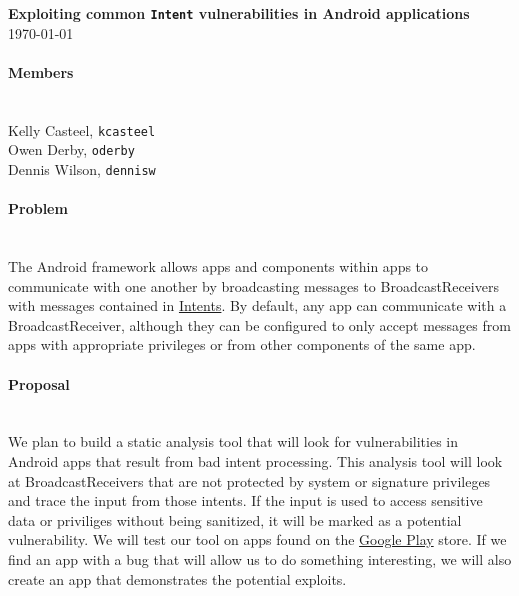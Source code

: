 \documentclass[12pt,a4paper,draft]{article}
\begin{document}


\flushleft\textbf{Exploiting common \texttt{Intent} vulnerabilities in Android %
applications}\\
\today\\

\paragraph{Members} ~\\

Kelly Casteel, \texttt{kcasteel}\\
Owen Derby, \texttt{oderby}\\
Dennis Wilson, \texttt{dennisw}\\

\paragraph{Problem} ~\\
The Android framework allows apps and components within apps to communicate with
one another by broadcasting messages to BroadcastReceivers with messages
contained in
\href{https://developer.android.com/reference/android/content/Intent.html}{Intents}.
By default, any app can communicate with a BroadcastReceiver, although they can
be configured to only accept messages from apps with appropriate privileges or
from other components of the same app.

\paragraph{Proposal} ~\\
We plan to build a static analysis tool that will look for vulnerabilities in
Android apps that result from bad intent processing. This analysis tool will
look at BroadcastReceivers that are not protected by system or signature
privileges and trace the input from those intents. If the input is used to
access sensitive data or priviliges without being sanitized, it will be marked
as a potential vulnerability. We will test our tool on apps found on the
\href{https://play.google.com/store/apps}{Google Play} store. If we find an app
with a bug that will allow us to do something interesting, we will also create
an app that demonstrates the potential exploits.


\end{document}
